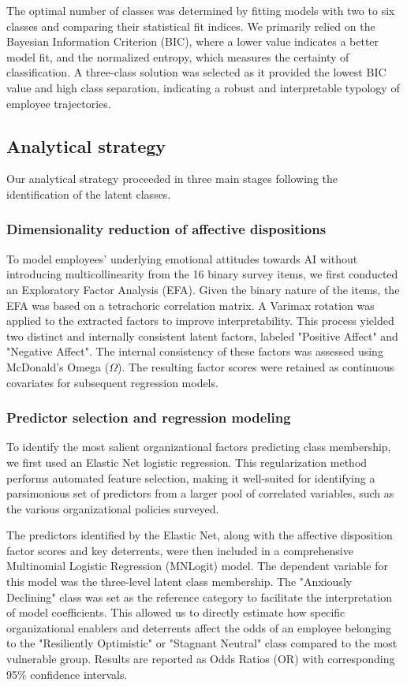 \documentclass[]{article}
\begin{document}
The optimal number of classes was determined by fitting models with two to six classes and comparing their statistical fit indices. We primarily relied on the Bayesian Information Criterion (BIC), where a lower value indicates a better model fit, and the normalized entropy, which measures the certainty of classification. A three-class solution was selected as it provided the lowest BIC value and high class separation, indicating a robust and interpretable typology of employee trajectories.

\subsection{Analytical strategy}
Our analytical strategy proceeded in three main stages following the identification of the latent classes.

\subsubsection{Dimensionality reduction of affective dispositions}
To model employees' underlying emotional attitudes towards AI without introducing multicollinearity from the 16 binary survey items, we first conducted an Exploratory Factor Analysis (EFA). Given the binary nature of the items, the EFA was based on a tetrachoric correlation matrix. A Varimax rotation was applied to the extracted factors to improve interpretability. This process yielded two distinct and internally consistent latent factors, labeled "Positive Affect" and "Negative Affect". The internal consistency of these factors was assessed using McDonald's Omega ($\Omega$). The resulting factor scores were retained as continuous covariates for subsequent regression models.

\subsubsection{Predictor selection and regression modeling}
To identify the most salient organizational factors predicting class membership, we first used an Elastic Net logistic regression. This regularization method performs automated feature selection, making it well-suited for identifying a parsimonious set of predictors from a larger pool of correlated variables, such as the various organizational policies surveyed.

The predictors identified by the Elastic Net, along with the affective disposition factor scores and key deterrents, were then included in a comprehensive Multinomial Logistic Regression (MNLogit) model. The dependent variable for this model was the three-level latent class membership. The "Anxiously Declining" class was set as the reference category to facilitate the interpretation of model coefficients. This allowed us to directly estimate how specific organizational enablers and deterrents affect the odds of an employee belonging to the "Resiliently Optimistic" or "Stagnant Neutral" class compared to the most vulnerable group. Results are reported as Odds Ratios (OR) with corresponding 95\% confidence intervals.
\end{document}
